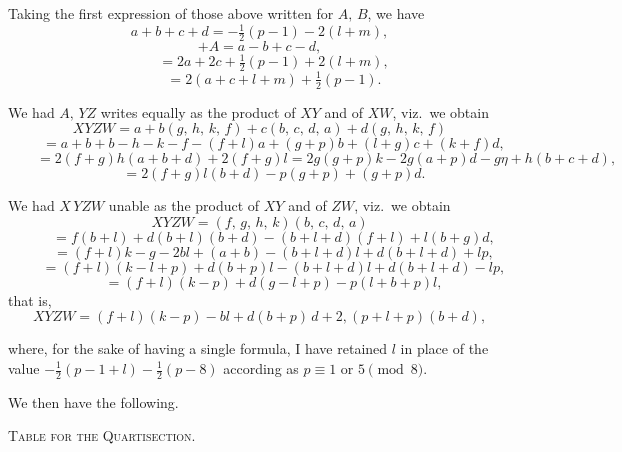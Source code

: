 \documentclass[11pt]{article}
\begin{document}
\medskip

\noindent
Taking the first expression of those above written for $A,\,B$, we have
\[
a + b + c + d = -\tfrac{1}{2}(p - 1) - 2(l + m),
\]
\[
+ A = a - b + c - d,
\]
\[
\qquad = 2a + 2c + \tfrac{1}{2}(p - 1) + 2(l + m),
\]
\[
\qquad = 2(a + c + l + m) + \tfrac{1}{2}(p - 1).
\]

\noindent
We had $A,\,YZ$ writes equally as the product of $XY$ and of $XW$, viz.\ we obtain
\[
XYZW = a + b(g,\,h,\,k,\,f) + c(b,\,c,\,d,\,a) + d(g,\,h,\,k,\,f)
\]
\[
\qquad = a + b + b - h - k - f - (f + l)a + (g + p)b + (l + g)c + (k + f)d,
\]
\[
\qquad = 2(f + g)h(a + b + d) + 2(f + g)l = 2g(g + p)k - 2g(a + p)d - g\eta + h(b + c + d),
\]
\[
\qquad = 2(f + g)l(b + d) - p(g + p) + (g + p)d.
\]

\noindent
We had $X\,YZW$ unable as the product of $XY$ and of $ZW$, viz.\ we obtain
\[
XYZW = (f,\,g,\,h,\,k)(b,\,c,\,d,\,a)
\]
\[
\qquad = f(b + l) + d(b + l)(b + d) - (b + l + d)(f + l) + l(b + g)d,
\]
\[
\qquad = (f + l)k - g - 2bl + (a + b) - (b + l + d)l + d(b + l + d) + lp,
\]
\[
\qquad = (f + l)(k - l + p) + d(b + p)l - (b + l + d)l + d(b + l + d) - lp,
\]
\[
\qquad = (f + l)(k - p) + d(g - l + p) - p(l + b + p)l,
\]
that is,
\[
XYZW = (f + l)(k - p) - bl + d(b + p)\,d + 2,(p + l + p)(b + d),
\]

\noindent
where, for the sake of having a single formula, I have retained $l$ in place of the
value $-\tfrac{1}{2}(p - 1 + l) - \tfrac{1}{2}(p - 8)$ according as $p \equiv 1$ or $5 \pmod 8$.

\newpage

\noindent
We then have the following.

\bigskip

\begin{center}
\textsc{Table for the Quartisection.}
\end{center}

\medskip
\end{document}
